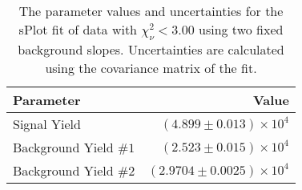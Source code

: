
\begin{table}[ht]
    \begin{center}
        \begin{tabular}{lr}\toprule
            Parameter & Value \\\midrule
            Signal Yield & $(4.899 \pm 0.013) \times 10^{4}$ \\
            Background Yield $\#1$ & $(2.523 \pm 0.015) \times 10^{4}$ \\
            Background Yield $\#2$ & $(2.9704 \pm 0.0025) \times 10^{4}$ \\\bottomrule
        \end{tabular}
        \caption{The parameter values and uncertainties for the sPlot fit of data with $\chi^2_\nu < 3.00$ using two fixed background slopes. Uncertainties are calculated using the covariance matrix of the fit.}\label{tab:splot-fit-results-chisqdof-3.00-fixed-2}
    \end{center}
\end{table}
